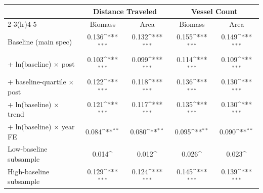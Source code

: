 \def\sym#1{\ifmmode^{#1}\else\(^{#1}\)\fi}
\begin{tabular}{l*{4}{c}}
\hline\hline
 &\multicolumn{2}{c}{Distance Traveled}&\multicolumn{2}{c}{Vessel Count}\\
\cmidrule(lr){2-3}\cmidrule(lr){4-5}
 &Biomass&Area&Biomass&Area\\
\hline
Baseline (main spec)                    &0.136{\sym{***}}&0.132{\sym{***}}&0.155{\sym{***}}&0.149{\sym{***}}\\
+ ln(baseline) $\times$ post            &0.103{\sym{***}}&0.099{\sym{***}}&0.114{\sym{***}}&0.109{\sym{***}}\\
+ baseline-quartile $\times$ post       &0.122{\sym{***}}&0.118{\sym{***}}&0.136{\sym{***}}&0.130{\sym{***}}\\
+ ln(baseline) $\times$ trend           &0.121{\sym{***}}&0.117{\sym{***}}&0.135{\sym{***}}&0.130{\sym{***}}\\
+ ln(baseline) $\times$ year FE         &0.084{\sym{**}}&0.080{\sym{**}}&0.095{\sym{**}}&0.090{\sym{**}}\\
Low-baseline subsample                  &0.014{\sym{}}&0.012{\sym{}}&0.026{\sym{}}&0.023{\sym{}}\\
High-baseline subsample                 &0.129{\sym{***}}&0.124{\sym{***}}&0.145{\sym{***}}&0.139{\sym{***}}\\
\hline\hline
\end{tabular}